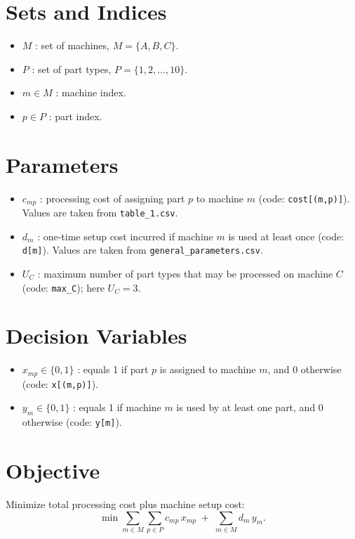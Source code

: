 \section*{Sets and Indices}

\begin{itemize}
    \item $M$ : set of machines, $M=\{A,B,C\}$.
    \item $P$ : set of part types, $P=\{1,2,\dots,10\}$.
    \item $m \in M$ : machine index.
    \item $p \in P$ : part index.
\end{itemize}

\section*{Parameters}

\begin{itemize}
    \item $c_{mp}$ : processing cost of assigning part $p$ to machine $m$ (code: \texttt{cost[(m,p)]}). Values are taken from \texttt{table\_1.csv}.
    \item $d_m$ : one-time setup cost incurred if machine $m$ is used at least once (code: \texttt{d[m]}). Values are taken from \texttt{general\_parameters.csv}.
    \item $U_C$ : maximum number of part types that may be processed on machine $C$ (code: \texttt{max\_C}); here $U_C=3$.
\end{itemize}

\section*{Decision Variables}

\begin{itemize}
    \item $x_{mp} \in \{0,1\}$ : equals 1 if part $p$ is assigned to machine $m$, and 0 otherwise (code: \texttt{x[(m,p)]}).
    \item $y_m \in \{0,1\}$ : equals 1 if machine $m$ is used by at least one part, and 0 otherwise (code: \texttt{y[m]}).
\end{itemize}

\section*{Objective}

Minimize total processing cost plus machine setup cost:
\[
\min \sum_{m \in M}\sum_{p \in P} c_{mp}\,x_{mp}
\;+\;
\sum_{m \in M} d_m\,y_m.
\]

